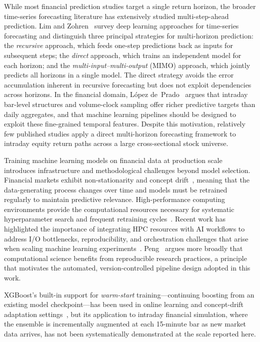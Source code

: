 \documentclass[conference]{IEEEtran}
\begin{document}
While most financial prediction studies target a single return horizon, the broader time-series forecasting literature has extensively studied multi-step-ahead prediction. Lim and Zohren~\cite{lim2021time} survey deep learning approaches for time-series forecasting and distinguish three principal strategies for multi-horizon prediction: the \emph{recursive} approach, which feeds one-step predictions back as inputs for subsequent steps; the \emph{direct} approach, which trains an independent model for each horizon; and the \emph{multi-input--multi-output} (MIMO) approach, which jointly predicts all horizons in a single model. The direct strategy avoids the error accumulation inherent in recursive forecasting but does not exploit dependencies across horizons. In the financial domain, L\'opez de~Prado~\cite{lopezdeprado2018afml} argues that intraday bar-level structures and volume-clock sampling offer richer predictive targets than daily aggregates, and that machine learning pipelines should be designed to exploit these fine-grained temporal features. Despite this motivation, relatively few published studies apply a direct multi-horizon forecasting framework to intraday equity return paths across a large cross-sectional stock universe.

Training machine learning models on financial data at production scale introduces infrastructure and methodological challenges beyond model selection. Financial markets exhibit non-stationarity and concept drift~\cite{widmer1996learning}, meaning that the data-generating process changes over time and models must be retrained regularly to maintain predictive relevance. High-performance computing environments provide the computational resources necessary for systematic hyperparameter search and frequent retraining cycles~\cite{drac2026hpc, Colonnelli2021StreamFlow}. Recent work has highlighted the importance of integrating HPC resources with AI workflows to address I/O bottlenecks, reproducibility, and orchestration challenges that arise when scaling machine learning experiments~\cite{lewis2025io, badia2024dagstuhl}. Peng~\cite{peng2011reproducible} argues more broadly that computational science benefits from reproducible research practices, a principle that motivates the automated, version-controlled pipeline design adopted in this work.

XGBoost's built-in support for \emph{warm-start} training---continuing boosting from an existing model checkpoint---has been used in online learning and concept-drift adaptation settings~\cite{chen2016xgboost}, but its application to intraday financial simulation, where the ensemble is incrementally augmented at each 15-minute bar as new market data arrives, has not been systematically demonstrated at the scale reported here.
\end{document}
